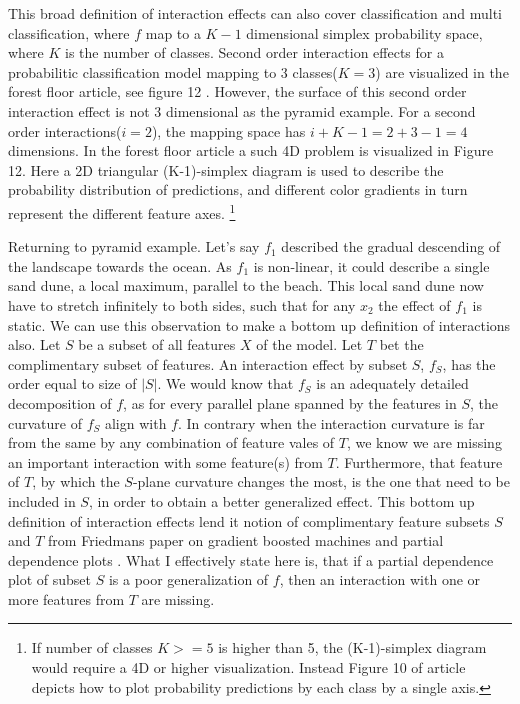 This broad definition of interaction effects can also cover classification and multi classification, where $f$ map to a $K-1$ dimensional simplex probability space, where $K$ is the number of classes. Second order interaction effects for a probabilitic classification model mapping to 3 classes($K=3$) are visualized in the forest floor article, see figure 12 \cite{welling2016forest}. However, the surface of this second order interaction effect is not 3 dimensional as the pyramid example. For a second order interactions($i=2$), the mapping space has $i+K-1=2+3-1=4$ dimensions. In the forest floor article a such 4D problem is visualized in Figure 12. Here a 2D triangular (K-1)-simplex diagram is used to describe the probability distribution of predictions, and different color gradients in turn represent the different feature axes. 
\footnote{If number of classes $K>=5$ is higher than 5, the (K-1)-simplex diagram would require a 4D or higher visualization. Instead Figure 10 of article depicts how to plot probability predictions by each class by a single axis.}

Returning to pyramid example. Let's say $f_1$ described the gradual descending of the landscape towards the ocean. As $f_1$ is non-linear, it could describe a single sand dune, a local maximum, parallel to the beach. This local sand dune now have to stretch infinitely to both sides, such that for any $x_2$ the effect of $f_1$ is static. We can use this observation to make a bottom up definition of interactions also. Let $S$ be a subset of all features $X$ of the model. Let $T$ bet the complimentary subset of features. An interaction effect by subset $S$, $f_S$, has the order equal to size of $|S|$. We would know that $f_S$ is an adequately detailed decomposition of $f$, as for every parallel plane spanned by the features in $S$, the curvature of $f_S$ align with $f$. In contrary when the interaction curvature is far from the same by any combination of feature vales of $T$, we know we are missing an important interaction with some feature(s) from $T$. Furthermore, that feature of $T$, by which the $S$-plane curvature changes the most, is the one that need to be included in $S$, in order to obtain a better generalized effect. This bottom up definition of interaction effects lend it notion of complimentary feature subsets $S$ and $T$ from Friedmans paper on gradient boosted machines and partial dependence plots \cite{friedman2001greedy}. What I effectively state here is, that if a partial dependence plot of subset $S$ is a poor generalization of $f$, then an interaction with one or more features from $T$ are missing. 

